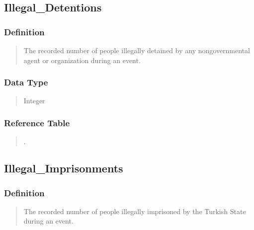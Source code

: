 \documentclass[letterpaper,10pt,english]{sphinxmanual}
\begin{document}
\subsection{Illegal\_Detentions}
\label{\detokenize{schema_tables:illegal-detentions}}

\subsubsection{Definition}
\label{\detokenize{schema_tables:id61}}\begin{quote}

\sphinxAtStartPar
The recorded number of people illegally detained by any non\sphinxhyphen{}governmental agent or organization during an event.
\end{quote}


\subsubsection{Data Type}
\label{\detokenize{schema_tables:id62}}\begin{quote}

\sphinxAtStartPar
Integer
\end{quote}


\subsubsection{Reference Table}
\label{\detokenize{schema_tables:id63}}\begin{quote}

\sphinxAtStartPar
{\hyperref[\detokenize{schema_tables:overview-table}]{}}.
\end{quote}


\subsection{Illegal\_Imprisonments}
\label{\detokenize{schema_tables:illegal-imprisonments}}

\subsubsection{Definition}
\label{\detokenize{schema_tables:id64}}\begin{quote}

\sphinxAtStartPar
The recorded number of people illegally imprisoned by the Turkish State during an event.
\end{quote}
\end{document}
